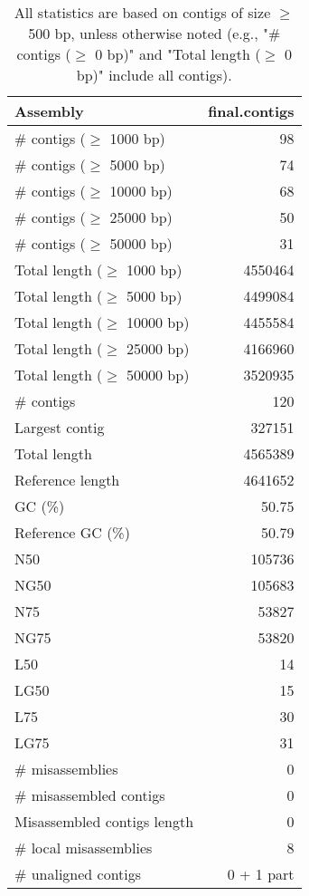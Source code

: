 \documentclass[12pt,a4paper]{article}
\begin{document}
\begin{table}[ht]
\begin{center}
\caption{All statistics are based on contigs of size $\geq$ 500 bp, unless otherwise noted (e.g., "\# contigs ($\geq$ 0 bp)" and "Total length ($\geq$ 0 bp)" include all contigs).}
\begin{tabular}{|l*{1}{|r}|}
\hline
Assembly & final.contigs \\ \hline
\# contigs ($\geq$ 1000 bp) & 98 \\ \hline
\# contigs ($\geq$ 5000 bp) & 74 \\ \hline
\# contigs ($\geq$ 10000 bp) & 68 \\ \hline
\# contigs ($\geq$ 25000 bp) & 50 \\ \hline
\# contigs ($\geq$ 50000 bp) & 31 \\ \hline
Total length ($\geq$ 1000 bp) & 4550464 \\ \hline
Total length ($\geq$ 5000 bp) & 4499084 \\ \hline
Total length ($\geq$ 10000 bp) & 4455584 \\ \hline
Total length ($\geq$ 25000 bp) & 4166960 \\ \hline
Total length ($\geq$ 50000 bp) & 3520935 \\ \hline
\# contigs & 120 \\ \hline
Largest contig & 327151 \\ \hline
Total length & 4565389 \\ \hline
Reference length & 4641652 \\ \hline
GC (\%) & 50.75 \\ \hline
Reference GC (\%) & 50.79 \\ \hline
N50 & 105736 \\ \hline
NG50 & 105683 \\ \hline
N75 & 53827 \\ \hline
NG75 & 53820 \\ \hline
L50 & 14 \\ \hline
LG50 & 15 \\ \hline
L75 & 30 \\ \hline
LG75 & 31 \\ \hline
\# misassemblies & 0 \\ \hline
\# misassembled contigs & 0 \\ \hline
Misassembled contigs length & 0 \\ \hline
\# local misassemblies & 8 \\ \hline
\# unaligned contigs & 0 + 1 part \\ \hline

\end{tabular}
\end{center}
\end{table}
\end{document}
